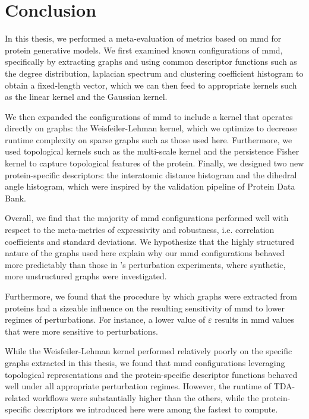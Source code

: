 \chapter{Conclusion}\label{chap:conclusion}

In this thesis, we performed a meta-evaluation of metrics based on
\acrshort{mmd} for protein generative models. We first examined known
configurations of \acrshort{mmd}, specifically by extracting graphs and using
common descriptor functions such as the degree distribution, laplacian spectrum
and clustering coefficient histogram to obtain a fixed-length vector, which we
can then feed to appropriate kernels such as the linear kernel and the Gaussian
kernel.

We then expanded the configurations of \acrshort{mmd} to include a kernel that operates
directly on graphs: the Weisfeiler-Lehman kernel, which we optimize to decrease
runtime complexity on sparse graphs such as those used here. Furthermore, we
used topological kernels such as the multi-scale kernel and the persistence
Fisher kernel to capture topological features of the protein. Finally, we
designed two new protein-specific descriptors: the interatomic distance
histogram and the dihedral angle histogram, which were inspired by the
validation pipeline of Protein Data Bank.

Overall, we find that the majority of \acrshort{mmd} configurations performed
well with respect to the meta-metrics of expressivity and robustness, i.e.
correlation coefficients and standard deviations. We hypothesize that the highly
structured nature of the graphs used here explain why our \acrshort{mmd}
configurations behaved more predictably than those in
\cite{obray2022evaluation}'s perturbation experiments, where synthetic, more
unstructured graphs were investigated.


Furthermore, we found that the procedure by which graphs were extracted from
proteins had a sizeable influence on the resulting sensitivity of \acrshort{mmd} to lower
regimes of perturbations. For instance, a lower value of $\varepsilon$ results
in \acrshort{mmd} values that were more sensitive to perturbations.

While the Weisfeiler-Lehman kernel performed relatively poorly on the specific
graphs extracted in this thesis, we found that \acrshort{mmd} configurations leveraging
topological representations and the protein-specific descriptor functions
behaved well under all appropriate perturbation regimes. However, the runtime of
TDA-related workflows were substantially higher than the others, while the
protein-specific descriptors we introduced here were among the fastest to
compute.

